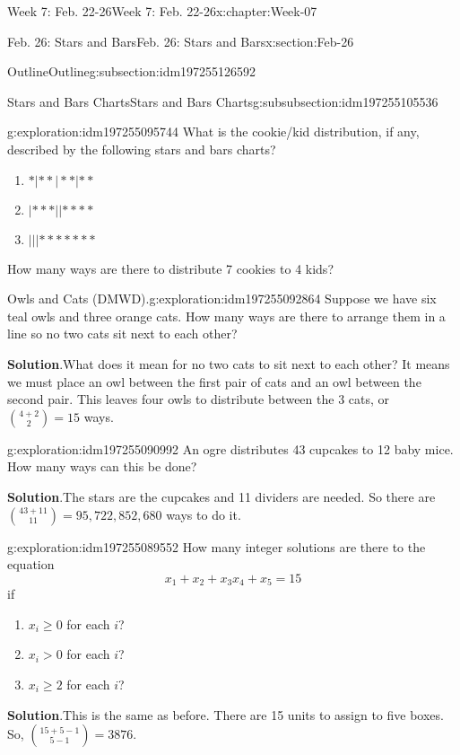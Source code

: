 \documentclass[oneside,10pt,]{book}
\newcommand{\blocktitlefont}{\relax}
\numberwithin{equation}{section}
\renewcommand{\ge}{\geqslant}
\newcommand{\gt}{>}
\begin{document}
\begin{chapterptx}{Week 7: Feb. 22-26}{}{Week 7: Feb. 22-26}{}{}{x:chapter:Week-07}
\begin{sectionptx}{Feb. 26: Stars and Bars}{}{Feb. 26: Stars and Bars}{}{}{x:section:Feb-26}
\begin{subsectionptx}{Outline}{}{Outline}{}{}{g:subsection:idm197255126592}
\begin{subsubsectionptx}{Stars and Bars Charts}{}{Stars and Bars Charts}{}{}{g:subsubsection:idm197255105536}
\begin{exploration}{}{g:exploration:idm197255095744}%
What is the cookie\slash{}kid distribution, if any, described by the following stars and bars charts?%
%
\begin{enumerate}
\item{}\(\displaystyle *|**|**|**\)%
\item{}\(\displaystyle |***||****\)%
\item{}\(\displaystyle |||*******\)%
\end{enumerate}
How many ways are there to distribute 7 cookies to 4 kids?%
\end{exploration}%
\begin{exploration}{Owls and Cats (DMWD).}{g:exploration:idm197255092864}%
Suppose we have six teal owls and three orange cats. How many ways are there to arrange them in a line so no two cats sit next to each other?%
\par\smallskip%
\noindent\textbf{\blocktitlefont Solution}.\hypertarget{g:solution:idm197255091904}{}\quad{}What does it mean for no two cats to sit next to each other? It means we must place an owl between the first pair of cats and an owl between the second pair. This leaves four owls to distribute between the 3 cats, or \(\binom{4+2}{2} = 15\) ways.\end{exploration}%
\begin{exploration}{}{g:exploration:idm197255090992}%
An ogre distributes 43 cupcakes to 12 baby mice. How many ways can this be done?%
\par\smallskip%
\noindent\textbf{\blocktitlefont Solution}.\hypertarget{g:solution:idm197255090320}{}\quad{}The stars are the cupcakes and 11 dividers are needed. So there are \(\binom{43+11}{11} = 95,722,852,680\) ways to do it.\end{exploration}%
\begin{exploration}{}{g:exploration:idm197255089552}%
How many integer solutions are there to the equation%
%
\begin{equation*}
x_1 + x_2 + x_3  x_4 + x_5 = 15
\end{equation*}
if %
\begin{enumerate}
\item{}\(x_i \ge 0\) for each \(i\)?%
\item{}\(x_i \gt 0\) for each \(i\)?%
\item{}\(x_i \ge 2\) for each \(i\)?%
\end{enumerate}
\par\smallskip%
\noindent\textbf{\blocktitlefont Solution}.\hypertarget{g:solution:idm197255085168}{}\quad{}This is the same as before. There are 15 units to assign to five boxes. So, \(\binom{15+5-1}{5-1} = 3876\).%

\end{exploration}
\end{subsubsectionptx}
\end{subsectionptx}
\end{sectionptx}
\end{chapterptx}
\end{document}
